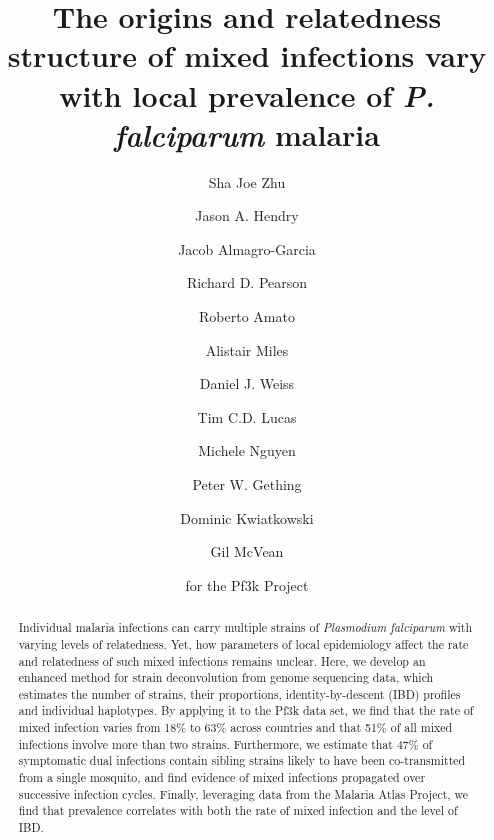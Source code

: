 \documentclass[9pt,lineno]{elife}
\begin{document}
\listoftodos
\clearpage
\setcounter{page}{1}


\title{The origins and relatedness structure of mixed infections vary with local prevalence of {\it P. falciparum} malaria}
\newcommand\shorttitle{Mixed infections in malaria}
\date{}

\author[1$\dagger$]{Sha Joe Zhu}
\author[1$\dagger$]{Jason A. Hendry}
\author[1,2,3,4]{Jacob Almagro-Garcia}

\author[2,3,4]{Richard D. Pearson}
\author[2,3,4]{Roberto Amato}
\author[1,2,3,4]{Alistair Miles}

\author[1]{Daniel J. Weiss}
\author[1]{Tim C.D. Lucas}
\author[1]{Michele Nguyen}


\author[1]{Peter W. Gething}
\author[1,2,3,4]{Dominic Kwiatkowski}
\author[1,3*]{Gil McVean}

\author[5]{for the Pf3k Project}



\maketitle{}

\begin{abstract}
Individual malaria infections can carry multiple strains of {\it Plasmodium falciparum} with varying levels of relatedness.  Yet, how parameters of local epidemiology affect the rate and relatedness of such mixed infections remains unclear.  Here, we develop an enhanced method for strain deconvolution from genome sequencing data, which estimates the number of strains, their proportions, identity-by-descent (IBD) profiles and individual haplotypes.  By applying it to the Pf3k data set, we find that the rate of mixed infection varies from 18\% to 63\% across countries and that 51\% of all mixed infections involve more than two strains.  Furthermore, we estimate that 47\% of symptomatic dual infections contain sibling strains likely to have been co-transmitted from a single mosquito, and find evidence of mixed infections propagated over successive infection cycles.  Finally, leveraging data from the Malaria Atlas Project, we find that prevalence correlates with both the rate of mixed infection and the level of IBD.
\end{abstract}
\end{document}
